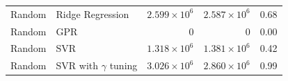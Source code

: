 \begin{table}[H]
\begin{tabular}{@{}llrrr@{}}
		Random & Ridge Regression           & \(2.599 \times 10^{6}\) & \(2.587 \times 10^{6}\) & 0.68      \\
		Random & GPR                        & 0                       & 0                       & 0.00      \\
		Random & SVR                        & \(1.318 \times 10^{6}\) & \(1.381 \times 10^{6}\) & 0.42      \\
		Random & SVR with \(\gamma\) tuning & \(3.026 \times 10^{6}\) & \(2.860 \times 10^{6}\) & 0.99      \\
		\bottomrule
	\end{tabular}
	\label{tab:dispersion_global_forecasting}
\end{table}
